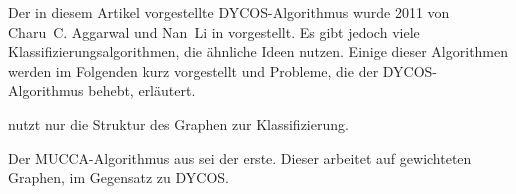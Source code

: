 Der in diesem Artikel vorgestellte DYCOS-Algorithmus wurde 2011 von
Charu~C. Aggarwal und Nan~Li in \cite{aggarwal2011} vorgestellt.
Es gibt jedoch viele Klassifizierungsalgorithmen, die ähnliche Ideen
nutzen. Einige dieser Algorithmen werden im Folgenden kurz vorgestellt
und Probleme, die der DYCOS-Algorithmus behebt, erläutert.

\cite{DBLP:conf/kdd/BhagatCR07} nutzt nur die Struktur des Graphen 
zur Klassifizierung.

Der MUCCA-Algorithmus aus \cite{zappella} sei der erste. Dieser
arbeitet auf gewichteten Graphen, im Gegensatz zu DYCOS.
